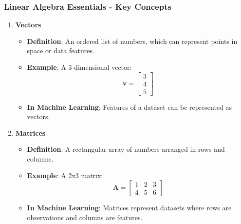 \documentclass{beamer}
\begin{document}
\begin{frame}[fragile]
    \frametitle{Linear Algebra Essentials - Key Concepts}
    \begin{enumerate}
        \item \textbf{Vectors}
        \begin{itemize}
            \item \textbf{Definition}: An ordered list of numbers, which can represent points in space or data features.
            \item \textbf{Example}: A 3-dimensional vector:  
            \[
            \mathbf{v} = 
            \begin{bmatrix}
            3 \\
            4 \\
            5
            \end{bmatrix}
            \]
            \item \textbf{In Machine Learning}: Features of a dataset can be represented as vectors.
        \end{itemize} 
        
        \item \textbf{Matrices}
        \begin{itemize}
            \item \textbf{Definition}: A rectangular array of numbers arranged in rows and columns.
            \item \textbf{Example}: A 2x3 matrix:  
            \[
            \mathbf{A} = 
            \begin{bmatrix}
            1 & 2 & 3 \\
            4 & 5 & 6
            \end{bmatrix}
            \]
            \item \textbf{In Machine Learning}: Matrices represent datasets where rows are observations and columns are features.
        \end{itemize}
    \end{enumerate}
\end{frame}
\end{document}
